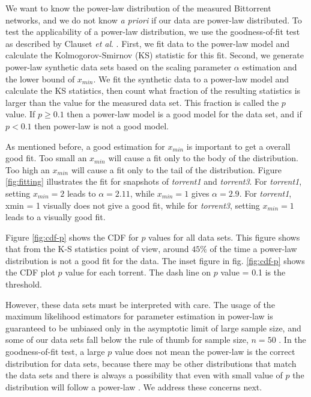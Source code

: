 \documentclass[paper]{ieice}
\begin{document}
We want to know the power-law distribution of the measured Bittorrent networks, and we do not know \textit{a priori} if our data are power-law distributed.
To test the applicability of a power-law distribution, we use the goodness-of-fit test as described by Clauset \textit{et al}. \cite{clauset2009power}. 
First, we fit data to the power-law model and calculate the Kolmogorov-Smirnov (KS) statistic for this fit. 
Second, we generate power-law synthetic data sets based on the scaling parameter $\alpha$ estimation and the lower bound of $x_{min}$. 
We fit the synthetic data to a power-law model and calculate the KS statistics, then count what fraction of the resulting statistics is larger than the value for the measured data set. 
This fraction is called the $p$ value.  
If $p \geq 0.1$ then a power-law model is a good model for the data set, and if $p < 0.1$ then power-law is not a good model.

As mentioned before, a good estimation for $x_{min}$ is important to get a overall good fit.
Too small an $x_{min}$ will cause a fit only to the body of the distribution.
Too high an $x_{min}$ will cause a fit only to the tail of the distribution.
Figure  \ref{fig:fitting} illustrates the fit for snapshots of \emph{torrent1} and \emph{torrent3}.
For \emph{torrent1}, setting $x_{min}=2$  leads to  $\alpha=2.11$, while $x_{min}=1$ gives $\alpha=2.9$.
For \emph{torrent1}, xmin = 1 visually does not give a good fit, while for  \emph{torrent3}, setting $x_{min}=1$ leads to a visually good fit.

Figure  \ref{fig:cdf-p} shows the CDF for $p$ values for all data sets. 
This figure shows that from the K-S statistics point of view, around $45\%$ of the time a power-law distribution is not a good fit for the data. 
The inset figure in fig. \ref{fig:cdf-p} shows the CDF plot $p$ value for each torrent. 
The dash line on $p$ value = 0.1 is the threshold.

However, these data sets must be interpreted with care. 
The usage of the maximum likelihood estimators for parameter estimation in power-law is guaranteed to be unbiased only in the asymptotic limit of large sample size, and some of our data sets fall below the rule of thumb for sample size, $n=50$ \cite{clauset2009power}. 
In the goodness-of-fit test, a large $p$ value does not mean the power-law  is the correct distribution for data sets, because there may be other distributions that match the data sets and there is always a possibility that even with small value of $p$ the distribution will follow a power-law \cite{clauset2009power}. 
We address these concerns next.
\end{document}
